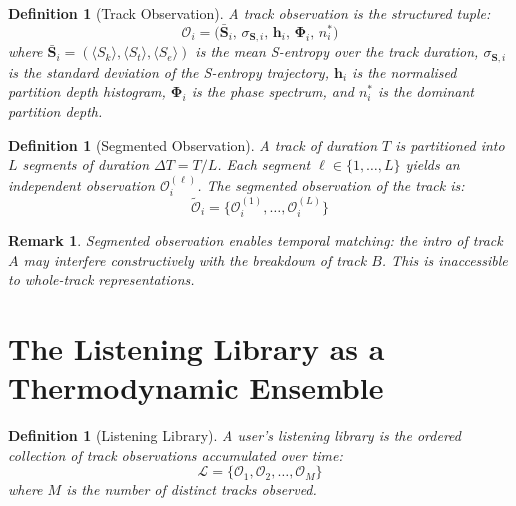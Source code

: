 \documentclass[11pt,twocolumn,a4paper]{article}
\newtheorem{definition}[theorem]{Definition}
\newtheorem{remark}[theorem]{Remark}
\newcommand{\Sk}{S_k}
\newcommand{\St}{S_t}
\newcommand{\Se}{S_e}
\newcommand{\Lib}{\mathcal{L}}
\newcommand{\Spec}{\bm{\Phi}}
\begin{document}
\begin{definition}[Track Observation]
\label{def:observation}
A \emph{track observation} is the structured tuple:
\begin{equation}
  \mathcal{O}_i = \bigl(\bar{\mathbf{S}}_i,\, \sigma_{\mathbf{S},i},\,
  \mathbf{h}_i,\, \Spec_i,\, n_i^*\bigr)
  \label{eq:observation}
\end{equation}
where $\bar{\mathbf{S}}_i = (\langle \Sk \rangle, \langle \St \rangle,
\langle \Se \rangle)$ is the mean S-entropy over the track duration,
$\sigma_{\mathbf{S},i}$ is the standard deviation of the S-entropy
trajectory, $\mathbf{h}_i$ is the normalised partition depth histogram,
$\Spec_i$ is the phase spectrum, and $n_i^*$ is the dominant partition
depth.
\end{definition}

\begin{definition}[Segmented Observation]
\label{def:segmented}
A track of duration $T$ is partitioned into $L$ segments of duration
$\Delta T = T / L$. Each segment $\ell \in \{1, \ldots, L\}$ yields an
independent observation $\mathcal{O}_i^{(\ell)}$. The segmented
observation of the track is:
\begin{equation}
  \tilde{\mathcal{O}}_i =
  \bigl\{\mathcal{O}_i^{(1)}, \ldots, \mathcal{O}_i^{(L)}\bigr\}
  \label{eq:segmented}
\end{equation}
\end{definition}

\begin{remark}
Segmented observation enables temporal matching: the intro of track $A$
may interfere constructively with the breakdown of track $B$. This is
inaccessible to whole-track representations.
\end{remark}


\section{The Listening Library as a Thermodynamic Ensemble}
\label{sec:ensemble}

\begin{definition}[Listening Library]
\label{def:library}
A user's listening library is the ordered collection of track
observations accumulated over time:
\begin{equation}
  \Lib = \bigl\{\mathcal{O}_1, \mathcal{O}_2, \ldots,
  \mathcal{O}_M\bigr\}
  \label{eq:library}
\end{equation}
where $M$ is the number of distinct tracks observed.
\end{definition}
\end{document}
